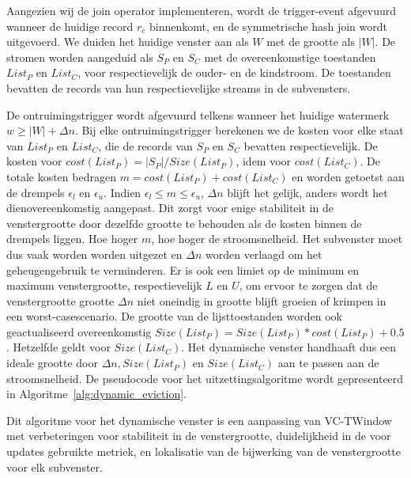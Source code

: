 Aangezien wij de join operator implementeren, wordt de trigger-event afgevuurd wanneer de huidige record 
$r_c$ binnenkomt, en de symmetrische hash join wordt uitgevoerd. We duiden het huidige venster aan als 
$W$ met de grootte als $|W|$. De stromen worden aangeduid als $S_P$ en $S_C$ met 
de overeenkomstige toestanden $List_P$ en $List_C$, voor respectievelijk de ouder- en 
de kindstroom. De toestanden bevatten de records van hun 
respectievelijke streams in de subvensters.

De ontruimingstrigger wordt afgevuurd telkens wanneer het huidige watermerk 
$w \ge |W| + \Delta n$. Bij elke ontruimingstrigger berekenen we
de kosten voor elke staat van $List_P$ en $List_C$, die de records van $S_P$ en $S_C$ bevatten
respectievelijk. De kosten voor $cost(List_P) = |S_P|/Size(List_P)$, idem voor $cost(List_C)$. 
De totale kosten bedragen $m = cost(List_P) + cost(List_C)$ en worden getoetst aan de drempels $\epsilon_l$ en $\epsilon_u$. Indien $\epsilon_l \le m \le \epsilon_u$, 
$\Delta n$ blijft het gelijk, anders wordt het dienovereenkomstig aangepast. Dit zorgt voor enige stabiliteit 
in de venstergrootte door dezelfde grootte te behouden als de kosten binnen de drempels liggen. 
Hoe hoger $m$, hoe hoger de stroomsnelheid. Het subvenster moet dus vaak worden 
worden uitgezet en $\Delta n$ worden verlaagd om het geheugengebruik te verminderen. Er is ook een limiet op de 
minimum en maximum venstergrootte, respectievelijk $L$ en $U$, om ervoor te zorgen dat de venstergrootte 
grootte $\Delta n$ niet oneindig in grootte blijft groeien of krimpen in een worst-casescenario. 
De grootte van de lijsttoestanden 
worden ook geactualiseerd overeenkomstig $Size(List_P) = Size(List_P) * cost(List_P) + 0.5$.
Hetzelfde geldt voor $Size(List_C)$. 
Het dynamische venster handhaaft dus een 
ideale grootte door $\Delta n, Size(List_P)$ en $Size(List_C)$ aan te passen aan 
de stroomsnelheid. De pseudocode voor het uitzettingsalgoritme wordt gepresenteerd in Algoritme~\ref{alg:dynamic_eviction}.

Dit algoritme voor het dynamische venster is een aanpassing van VC-TWindow~\cite{vctw_join} met 
verbeteringen voor stabiliteit in de venstergrootte, duidelijkheid in de voor updates gebruikte metriek, en lokalisatie 
van de bijwerking van de venstergrootte voor elk subvenster.  

